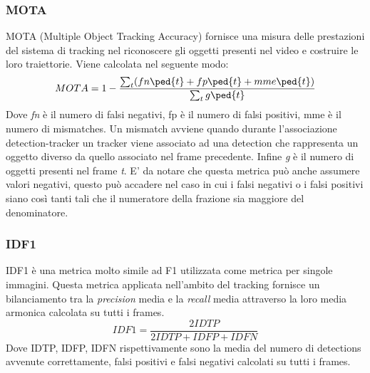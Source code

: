 \subsubsection{MOTA}
MOTA (Multiple Object Tracking Accuracy)\cite{MOTmetrics} fornisce una misura delle prestazioni del sistema di tracking nel riconoscere gli oggetti presenti nel video e costruire le loro traiettorie. Viene calcolata nel seguente modo:
\[
MOTA = 1-\frac{\sum_{t}^{}(fn\ped{t}+fp\ped{t}+mme\ped{t})}{\sum_{t}^{}g\ped{t}}
\]
Dove \textit{fn} è il numero di falsi negativi, fp è il numero di falsi positivi, mme è il numero di mismatches. Un mismatch avviene quando durante l'associazione detection-tracker un tracker viene associato ad una detection che rappresenta un oggetto diverso da quello associato nel frame precedente. Infine  \textit{g} è il numero di oggetti presenti nel frame \textit{t}. E' da notare che questa metrica può anche assumere valori negativi, questo può accadere nel caso in cui i falsi negativi o i falsi positivi siano così tanti tali che il numeratore della frazione sia maggiore del denominatore.
\subsubsection{IDF1}
IDF1\cite{IDF1} è una metrica molto simile ad F1 utilizzata come metrica per singole immagini. Questa metrica applicata nell'ambito del tracking fornisce un bilanciamento tra la \textit{precision} media e la \textit{recall} media attraverso la loro media armonica calcolata su tutti i frames. 
\[
IDF1 = \frac{2IDTP}{2IDTP+IDFP+IDFN}
\]
Dove IDTP, IDFP, IDFN rispettivamente sono la media del numero di detections avvenute correttamente, falsi positivi e falsi negativi calcolati su tutti i frames. 

